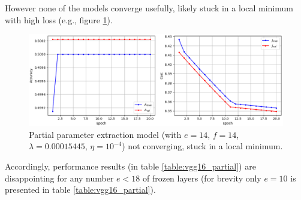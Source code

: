 However none of the models converge usefully, likely stuck in a local minimum with high loss (e.g., figure \ref{fig:vgg16_partial_divergence}).

\begin{figure}[ht]
    \centering
    \includegraphics[width=1.0\textwidth]{figs/vgg16_partial_divergence.png}
    \caption{Partial parameter extraction model (with $e = 14$, $f = 14$, $\lambda = 0.00015445$, $\eta = 10^{-4}$) not converging, stuck in a local minimum.}
    \label{fig:vgg16_partial_divergence}
\end{figure}

Accordingly, performance results (in table \ref{table:vgg16_partial}) are disappointing for any number $e < 18$ of frozen layers (for brevity only $e = 10$ is presented in table \ref{table:vgg16_partial}).

